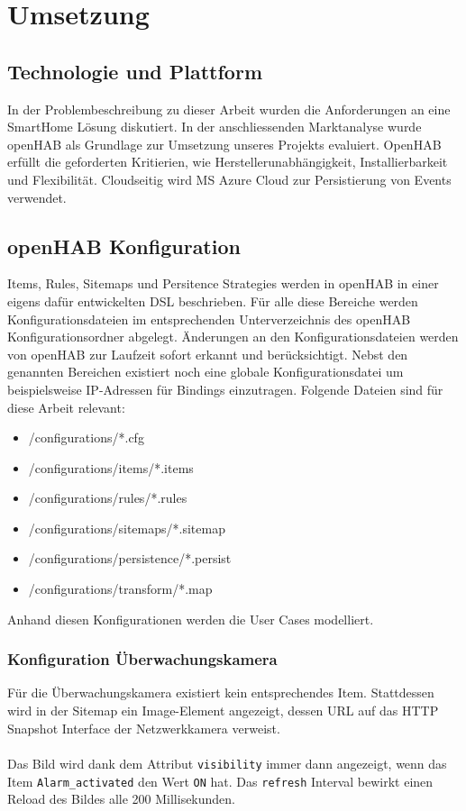 \section{Umsetzung}
\subsection{Technologie und Plattform}
In der Problembeschreibung zu dieser Arbeit wurden die Anforderungen an eine SmartHome Lösung diskutiert. In der anschliessenden Marktanalyse wurde openHAB als Grundlage zur Umsetzung unseres Projekts evaluiert. OpenHAB erfüllt die geforderten Kritierien, wie Herstellerunabhängigkeit, Installierbarkeit und Flexibilität. Cloudseitig wird MS Azure Cloud zur Persistierung von Events verwendet.


\subsection{openHAB Konfiguration}
Items, Rules, Sitemaps und Persitence Strategies werden in openHAB in einer eigens dafür entwickelten DSL beschrieben. Für alle diese Bereiche werden Konfigurationsdateien im entsprechenden Unterverzeichnis des openHAB Konfigurationsordner abgelegt. Änderungen an den Konfigurationsdateien werden von openHAB zur Laufzeit sofort erkannt und berücksichtigt. Nebst den genannten Bereichen existiert noch eine globale Konfigurationsdatei um beispielsweise IP-Adressen für Bindings einzutragen. Folgende Dateien sind für diese Arbeit relevant:

\begin{itemize}
	\item /configurations/*.cfg
	\item /configurations/items/*.items
	\item /configurations/rules/*.rules
	\item /configurations/sitemaps/*.sitemap
	\item /configurations/persistence/*.persist
	\item /configurations/transform/*.map
\end{itemize}

Anhand diesen Konfigurationen werden die User Cases modelliert.

\subsubsection{Konfiguration Überwachungskamera} 
Für die Überwachungskamera existiert kein entsprechendes Item. Stattdessen wird in der Sitemap ein Image-Element angezeigt, dessen URL auf das HTTP Snapshot Interface der Netzwerkkamera verweist.\\ \\
Das Bild wird dank dem Attribut \lstinline!visibility!  immer dann angezeigt, wenn das Item \lstinline!Alarm_activated! den Wert \lstinline!ON! hat. Das \lstinline!refresh! Interval bewirkt einen Reload des Bildes alle 200 Millisekunden.

